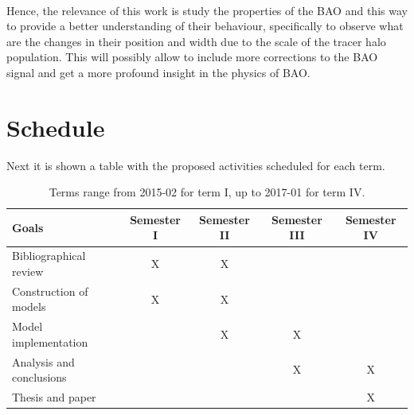 \documentclass[a4,useAMS,usegraphicx,12pt]{article}
\begin{document}
\

Hence, the relevance of this work is study the properties of the BAO and this way to provide a better understanding
of their behaviour, specifically to observe what are the changes in their position and width due to the scale of the 
tracer halo population. This will possibly allow to include more corrections to the BAO signal and 
get a more profound insight in the physics of BAO. 


\section{Schedule}
Next it is shown a table with the proposed activities scheduled for each term.

\begin{table}[h]
\begin{flushleft}
\begin{center}
  \begin{tabular}{l  c c c c } \hline\hline
	\centering\textbf{Goals} & \textbf{Semester I} & \textbf{Semester II} & 
	\textbf{Semester III} & \textbf{Semester IV} \\ \hline\hline
	
	 Bibliographical review & X & X & & \\
	 Construction of models & X & X & & \\
	 Model implementation &  & X & X & \\
	 Analysis and conclusions &  &  & X & X \\
	 Thesis and paper &  &  &  & X \\
	\hline\hline
  \end{tabular}  
  \caption{ Terms range from 2015-02 for term I, up to 2017-01 for term IV.}
\end{center}
\end{flushleft}
\end{table}



%
\renewcommand{\bibname}{11\ \ \ \ Bibliography}
\small

\end{document}
